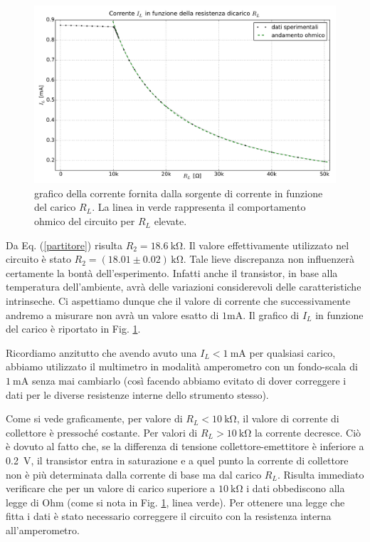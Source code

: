 \begin{figure}[H]
\centering
	\includegraphics[scale=0.45]{sorgente.pdf}
	\caption{grafico della corrente fornita dalla sorgente di corrente in funzione del carico $R_L$. La linea in verde rappresenta il comportamento ohmico del circuito per $R_L$ elevate.}
	\label{fig:sorg}
\end{figure}

Da Eq. (\ref{partitore}) risulta $R_2 = \SI{18.6}{\kilo\ohm} $.
Il valore effettivamente utilizzato nel circuito è stato $R_2 = (18.01 \pm 0.02 )\,\si{\kilo\ohm} $.
Tale lieve discrepanza non influenzerà certamente la bontà dell'esperimento.
Infatti anche il transistor, in base alla temperatura dell'ambiente, avrà delle variazioni considerevoli delle caratteristiche intrinseche.
Ci aspettiamo dunque che il valore di corrente che successivamente andremo a misurare non avrà un valore esatto di $1\si{\milli\ampere}$. 
Il grafico di $I_L$ in funzione del carico è riportato in Fig. \ref{fig:sorg}.

Ricordiamo anzitutto che avendo avuto una $I_L<\SI{1}{\milli\ampere}$ per qualsiasi carico, abbiamo utilizzato il multimetro in modalità amperometro con un fondo-scala di $\SI{1}{\milli\ampere}$ senza mai cambiarlo (così facendo abbiamo evitato di dover correggere i dati per le diverse resistenze interne dello strumento stesso).

Come si vede graficamente, per valore di $R_L<\SI{10}{\kilo\ohm}$, il valore di corrente di collettore è pressoché costante.
Per valori di $R_L>\SI{10}{\kilo\ohm}$ la corrente decresce.
Ciò è dovuto al fatto che, se la differenza di tensione collettore-emettitore è inferiore a \SI{0.2}{\volt}, il transistor entra in saturazione e a quel punto la corrente di  collettore non è più determinata dalla corrente di base ma dal carico $R_L$.
Risulta immediato verificare che  per un valore di carico superiore a $\SI{10}{\kilo\ohm}$ i dati obbediscono alla legge di Ohm (come si nota in Fig. \ref{fig:sorg}, linea verde).
Per ottenere una legge che fitta i dati è stato necessario correggere il circuito con la resistenza interna all'amperometro.